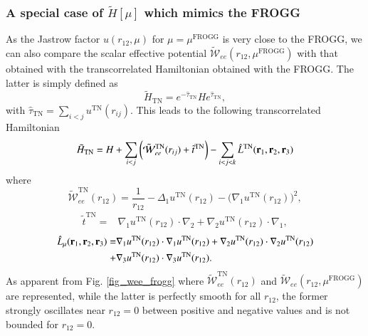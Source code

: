 \documentclass[aip,jcp,reprint,noshowkeys,superscriptaddress]{revtex4-1}
\newcommand{\bri}[1]{{\bf r}_{#1}}
\newcommand{\mfrogg}[0]{\mu^\text{FROGG}}
\begin{document}
\subsubsection{A special case of $\tilde{H}[\mu]$ which mimics the FROGG}
As the Jastrow factor $u(r_{12},\mu)$ for $\mu=\mfrogg$ is very close to the FROGG, we can also compare the scalar effective potential $\tilde{\mathcal{W}}_{ee}(r_{12},\mfrogg)$ with that obtained with the transcorrelated Hamiltonian obtained with the FROGG. 
The latter is simply defined as 
\begin{equation}
 \label{eq:tn_htilde}
 \tilde{H}_{\text{TN}} = e^{-\hat{\tau}_{\text{TN}}}H e^{\hat{\tau}_{\text{TN}}},
\end{equation}
with $\hat{\tau}_{\text{TN}} = \sum_{i<j} u^\text{TN}(r_{ij})$. 
This leads to the following transcorrelated Hamiltonian 
\begin{equation}
 \label{eq:tn_htilde_2}
  \tilde{H}_{\text{TN}} = H + \sum_{i<j} \bigg( \tilde{\mathcal{W}}^\text{TN}_{ee}(r_{ij}) + \tilde{t}^\text{TN} \bigg) - \sum_{i<j<k} \hat{L}^\text{TN}(\bri{1},\bri{2},\bri{3})
\end{equation}
where 
\begin{equation}
 \label{eq:_wee_frogg}
 \tilde{\mathcal{W}}_{ee}^\text{TN}(r_{12})= \frac{1}{r_{12}}-\Delta_1 u^{\text{TN}}(r_{12}) - \big(\nabla_1 u^{\text{TN}}(r_{12}) \big) ^2, 
\end{equation}
\begin{equation}
 \begin{aligned}
 \tilde{t}^\text{TN} = &\nabla_1 u^\text{TN}(r_{12}) \cdot \nabla_2 + \nabla_2 u^\text{TN}(r_{12})\cdot \nabla_1,
 \end{aligned}
\end{equation}
\begin{equation}
 \begin{aligned}
 \label{def_k}
  \hat{L}_\mu(\bri{1},\bri{2},\bri{3})  = & \nabla_1 u^\text{TN}(r_{12}) \cdot \nabla_1 u^\text{TN}(r_{12}) + \nabla_2 u^\text{TN}(r_{12}) \cdot \nabla_2 u^\text{TN}(r_{12})  \\
                                     + & \nabla_3 u^\text{TN}(r_{12}) \cdot \nabla_3 u^\text{TN}(r_{12}).
 \end{aligned}
\end{equation}
As apparent from Fig. \ref{fig_wee_frogg} where $\tilde{\mathcal{W}}_{ee}^\text{TN}(r_{12})$ and $\tilde{\mathcal{W}}_{ee}(r_{12},\mfrogg)$ are represented, while the latter is perfectly smooth for all $r_{12}$, the former strongly oscillates near $r_{12}=0$ between positive and negative values and is not bounded for $r_{12}=0$. 
\end{document}
